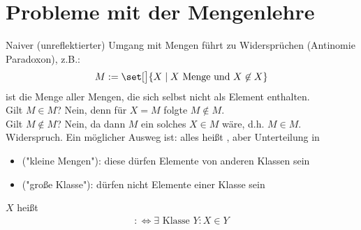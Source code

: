 \section{Probleme mit der Mengenlehre}
Naiver (unreflektierter) Umgang mit Mengen führt zu Widersprüchen (Antinomie Paradoxon), z.B.:
\begin{align*}
	M:=\set[\big]{X\mid X\text{ Menge und }X\not\in X}
\end{align*}
ist die Menge aller Mengen, die sich selbst nicht als Element enthalten.\\
Gilt $M\in M$?
Nein, denn für $X=M$ folgte $M\not\in M$.\\
Gilt $M\not\in M$? Nein, da dann $M$ ein solches $X\in M$ wäre, d.h. $M\in M$.
Widerspruch.\nl
Ein möglicher Ausweg ist: alles heißt , aber Unterteilung in
\begin{itemize}
	\item {} ("kleine Mengen"): diese dürfen Elemente von anderen Klassen sein
	\item {} ("große Klasse"): dürfen nicht Elemente einer Klasse sein
\end{itemize}

\begin{definition} %
	$X$ heißt 
	\begin{align*}
		:\iff\exists\text{ Klasse }Y:X\in Y
	\end{align*}
\end{definition}

